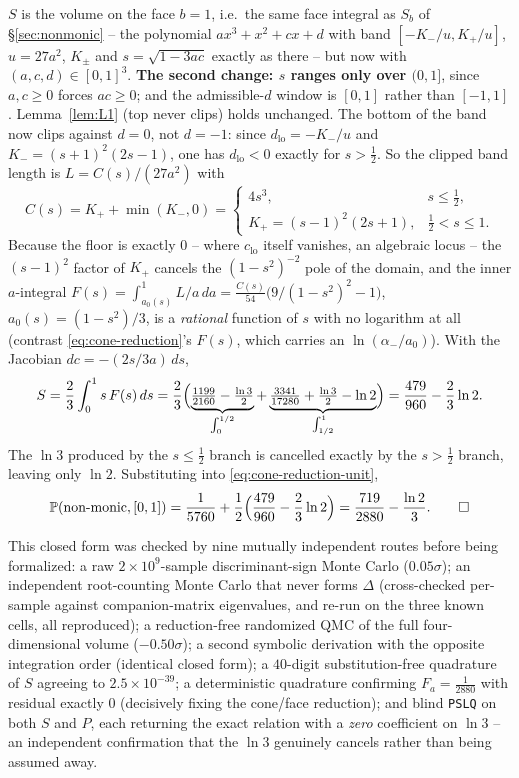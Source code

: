 \documentclass[11pt,reqno]{amsart}
\theoremstyle{plain}
\theoremstyle{remark}
\newcommand{\Prb}{\mathbb{P}}
\newcommand{\disc}{\Delta}
\begin{document}
$S$ is the volume on the face $b=1$, i.e.\ the same face integral as $S_b$ of
\S\ref{sec:nonmonic} -- the polynomial $ax^3+x^2+cx+d$ with band
$[-K_-/u,K_+/u]$, $u=27a^2$, $K_\pm$ and $s=\sqrt{1-3ac}$ exactly as there --
but now with $(a,c,d)\in[0,1]^3$. \textbf{The second change: $s$ ranges only
over $(0,1]$}, since $a,c\ge0$ forces $ac\ge0$; and the admissible-$d$ window
is $[0,1]$ rather than $[-1,1]$. Lemma~\ref{lem:L1} (top never clips) holds
unchanged. The bottom of the band now clips against $d=0$, not $d=-1$: since
$d_{\mathrm{lo}}=-K_-/u$ and $K_-=(s+1)^2(2s-1)$, one has $d_{\mathrm{lo}}<0$
exactly for $s>\tfrac12$. So the clipped band length is $L=C(s)/(27a^2)$ with
\[
  C(s)=K_++\min(K_-,0)=
  \begin{cases} 4s^3, & s\le\tfrac12,\\[1ex] K_+=(s-1)^2(2s+1), & \tfrac12<s\le1.\end{cases}
\]
Because the floor is exactly $0$ -- where $c_{\mathrm{lo}}$ itself vanishes,
an algebraic locus -- the $(s-1)^2$ factor of $K_+$ cancels the $(1-s^2)^{-2}$
pole of the domain, and the inner $a$-integral
$F(s)=\int_{a_0(s)}^1 L/a\,da=\tfrac{C(s)}{54}\bigl(9/(1-s^2)^2-1\bigr)$,
$a_0(s)=(1-s^2)/3$, is a \emph{rational} function of $s$ with no logarithm at
all (contrast \eqref{eq:cone-reduction}'s $F(s)$, which carries an
$\ln(\alpha_-/a_0)$). With the Jacobian $dc=-(2s/3a)\,ds$,
\[
  S=\frac{2}{3}\int_0^1 s\,F(s)\,ds
   =\frac{2}{3}\Bigl(\underbrace{\tfrac{1199}{2160}-\tfrac{\ln3}{2}}_{\int_0^{1/2}}
   +\underbrace{\tfrac{3341}{17280}+\tfrac{\ln3}{2}-\ln2}_{\int_{1/2}^{1}}\Bigr)
   =\frac{479}{960}-\frac{2}{3}\ln 2.
\]
The $\ln 3$ produced by the $s\le\tfrac12$ branch is cancelled exactly by the
$s>\tfrac12$ branch, leaving only $\ln 2$. Substituting into
\eqref{eq:cone-reduction-unit},
\[
  \Prb(\text{non-monic},[0,1])=\frac{1}{5760}+\frac12\Bigl(\frac{479}{960}-\frac{2}{3}\ln2\Bigr)
  =\frac{719}{2880}-\frac{\ln 2}{3}. \qedhere
\]

This closed form was checked by nine mutually independent routes before being
formalized: a raw $2\times10^9$-sample discriminant-sign Monte Carlo
($0.05\sigma$); an independent root-counting Monte Carlo that never forms
$\disc$ (cross-checked per-sample against companion-matrix eigenvalues, and
re-run on the three known cells, all reproduced); a reduction-free randomized
QMC of the full four-dimensional volume ($-0.50\sigma$); a second symbolic
derivation with the opposite integration order (identical closed form); a
$40$-digit substitution-free quadrature of $S$ agreeing to $2.5\times10^{-39}$;
a deterministic quadrature confirming $F_a=\tfrac{1}{2880}$ with residual
exactly $0$ (decisively fixing the cone/face reduction); and blind
\texttt{PSLQ} on both $S$ and $P$, each returning the exact relation with a
\emph{zero} coefficient on $\ln 3$ -- an independent confirmation that the
$\ln 3$ genuinely cancels rather than being assumed away.
\end{document}
